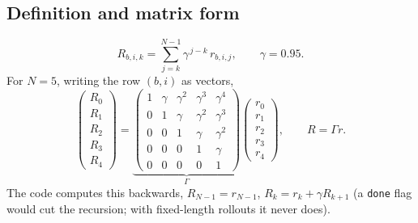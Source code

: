 \subsection{Definition and matrix form}
\begin{equation}
R_{b,i,k}=\sum_{j=k}^{N-1}\gamma^{\,j-k}\,r_{b,i,j},\qquad \gamma=0.95.
\label{loop:eq:return}
\end{equation}
For $N=5$, writing the row $(b,i)$ as vectors,
\begin{equation}
\begin{pmatrix}R_0\\R_1\\R_2\\R_3\\R_4\end{pmatrix}
=\underbrace{\begin{pmatrix}
1&\gamma&\gamma^2&\gamma^3&\gamma^4\\
0&1&\gamma&\gamma^2&\gamma^3\\
0&0&1&\gamma&\gamma^2\\
0&0&0&1&\gamma\\
0&0&0&0&1
\end{pmatrix}}_{\Gamma}
\begin{pmatrix}r_0\\r_1\\r_2\\r_3\\r_4\end{pmatrix},
\qquad R=\Gamma r .
\end{equation}
The code computes this backwards, $R_{N-1}=r_{N-1}$, $R_k=r_k+\gamma R_{k+1}$ (a \texttt{done} flag would cut the recursion; with fixed-length rollouts it never does).

